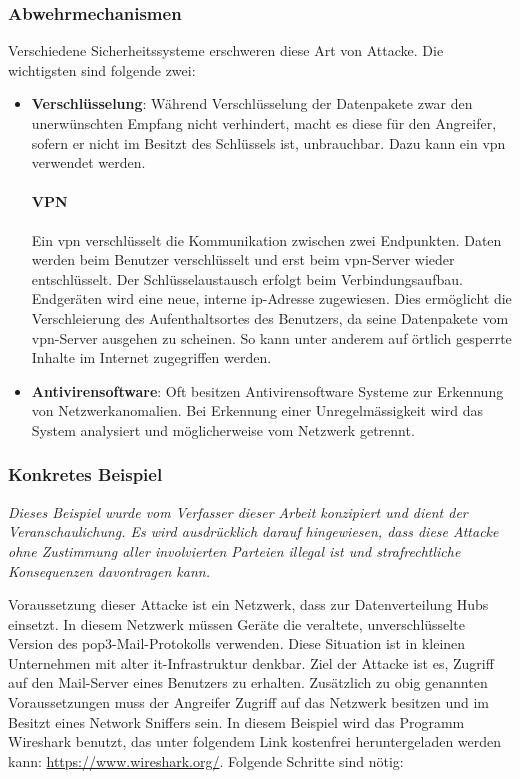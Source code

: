 \documentclass[11pt, a4paper]{article}
\begin{document}
\subsubsection{Abwehrmechanismen}
Verschiedene Sicherheitssysteme erschweren diese Art von Attacke. Die wichtigsten sind folgende zwei:
\begin{itemize}
	\item \textbf{Verschlüsselung}: Während Verschlüsselung der Datenpakete zwar den unerwünschten Empfang nicht verhindert, macht es diese für den Angreifer, sofern er nicht im Besitzt des Schlüssels ist, unbrauchbar. Dazu kann ein \gls{vpn} verwendet werden.
	\paragraph{VPN}
	Ein \gls{vpn} verschlüsselt die Kommunikation zwischen zwei Endpunkten. Daten werden beim Benutzer verschlüsselt und erst beim \gls{vpn}-Server wieder entschlüsselt. Der Schlüsselaustausch erfolgt beim Verbindungsaufbau. Endgeräten wird eine neue, interne \gls{ip}-Adresse zugewiesen. Dies ermöglicht die Verschleierung des Aufenthaltsortes des Benutzers, da seine Datenpakete vom \gls{vpn}-Server ausgehen zu scheinen. So kann unter anderem auf örtlich gesperrte Inhalte im Internet zugegriffen werden.~\cite{BSIWasis:online}
	\item \textbf{Antivirensoftware}: Oft besitzen Antivirensoftware Systeme zur Erkennung von Netzwerkanomalien. Bei Erkennung einer Unregelmässigkeit wird das System analysiert und möglicherweise vom Netzwerk getrennt.
\end{itemize}
\subsubsection{Konkretes Beispiel}
\textit{Dieses Beispiel wurde vom Verfasser dieser Arbeit konzipiert und dient der Veranschaulichung. Es wird ausdrücklich darauf hingewiesen, dass diese Attacke ohne Zustimmung aller involvierten Parteien illegal ist und strafrechtliche Konsequenzen davontragen kann.}

Voraussetzung dieser Attacke ist ein Netzwerk, dass zur Datenverteilung Hubs einsetzt. In diesem Netzwerk müssen Geräte die veraltete, unverschlüsselte Version des \gls{pop3}-Mail-Protokolls verwenden. Diese Situation ist in kleinen Unternehmen mit alter \gls{it}-Infrastruktur denkbar.  Ziel der Attacke ist es, Zugriff auf den Mail-Server eines Benutzers zu erhalten. Zusätzlich zu obig genannten Voraussetzungen muss der Angreifer Zugriff auf das Netzwerk besitzen und im Besitzt eines Network Sniffers sein. In diesem Beispiel wird das Programm Wireshark benutzt, das unter folgendem Link kostenfrei heruntergeladen werden kann: \url{https://www.wireshark.org/}. Folgende Schritte sind nötig:
\end{document}
